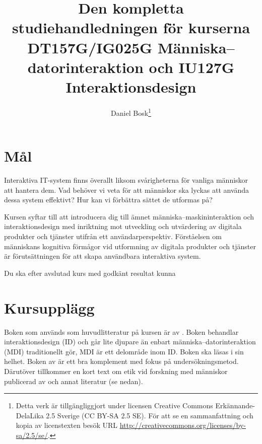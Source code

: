 \documentclass[a4paper,logo]{miunart}
\title{Den kompletta studiehandledningen för kurserna\\
  DT157G/IG025G Människa--datorinteraktion och IU127G Interaktionsdesign}
\author{Daniel Bosk\footnote{%
  Detta verk är tillgängliggjort under licensen Creative Commons 
  Erkännande-DelaLika 2.5 Sverige (CC BY-SA 2.5 SE).
	För att se en sammanfattning och kopia av licenstexten besök URL 
	\url{http://creativecommons.org/licenses/by-sa/2.5/se/}.
}}
\date{\svnId}
\begin{document}
\maketitle
\tableofcontents


\section{Mål}

Interaktiva IT-system finns överallt liksom svårigheterna för vanliga människor 
att hantera dem.
Vad behöver vi veta för att människor ska lyckas att använda dessa system 
effektivt?
Hur kan vi förbättra sättet de utformas på?

Kursen syftar till att introducera dig till ämnet människa--maskininteraktion 
och interaktionsdesign med inriktning mot utveckling och utvärdering av 
digitala produkter och tjänster utifrån ett användarperspektiv.
Förståelsen om människans kognitiva förmågor vid utformning av digitala 
produkter och tjänster är förutsättningen för att skapa användbara interaktiva 
system.

Du ska efter avslutad kurs med godkänt resultat kunna
\begin{itemize}
    
\end{itemize}


\section{Kursupplägg}

Boken som används som huvudlitteratur på kursen är  av 
\citet{Sharp2011idb}.
Boken behandlar interaktionsdesign (ID) och går lite djupare än enbart 
människa--datorinteraktion (MDI) traditionellt gör, MDI är ett delområde inom 
ID.
Boken ska läsas i sin helhet.
Boken  av \citet{Tullis2013mtu} är ett bra komplement 
med fokus på undersökningsmetod.
Därutöver tillkommer en kort text om etik vid forskning med människor 
publicerad av \citet{VR2002fpi} och annat literatur (se nedan).
\end{document}
